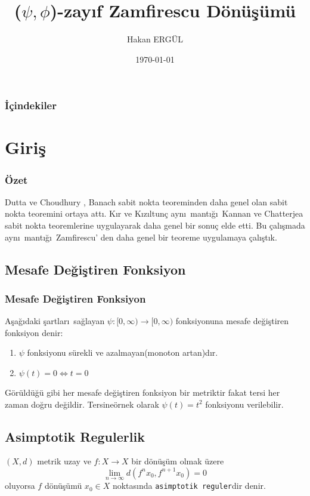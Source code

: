 \documentclass[8pt]{beamer}
\title{($\psi,\phi$)-zay\i f Zamfirescu D\"on\"u\c{s}\"um\"u}
\author{Hakan ERG\"UL}
\institute{Atat\"{u}rk \"{U}niversitesi}
\date{\today}
\begin{document}
\begin{frame}
\titlepage
\end{frame}
\begin{frame}
  \frametitle{\.{I}\c{c}indekiler}
  \tableofcontents
\end{frame}


\section{Giri\c{s}}
\begin{frame}
  \frametitle{\"Ozet}
  \textrm{Dutta ve Choudhury \cite{Dutta2008}, Banach sabit nokta teoreminden daha genel olan sabit nokta teoremini ortaya att\i . K\i r ve K\i z\i ltun\c{c} \cite{Kir2013} ayn\i \ mant\i \u{g}\i \ Kannan\cite{Kannan1969} ve Chatterjea\cite{Chatterjea1972} sabit nokta teoremlerine uygulayarak daha genel bir sonu\c{c} elde etti. Bu \c{c}al\i \c{s}mada ayn\i \ mant\i \u{g}\i \ Zamfirescu\cite{Zamfirescu1972}' den daha genel bir teoreme uygulamaya \c{c}al\i \c{s}t\i k.}
\end{frame}


\subsection{Mesafe De\u{g}i\c{s}tiren Fonksiyon}
\begin{frame}
\frametitle{Mesafe De\u{g}i\c{s}tiren Fonksiyon}
  \begin{definition}
     A\c{s}a\u{g}\i daki \c{s}artlar\i \ sa\u{g}layan $\psi:[0,\infty)\to[0,\infty)$ fonksiyonuna mesafe de\u{g}i\c{s}tiren fonksiyon denir:
     \begin{enumerate}
      \item $\psi$ fonksiyonu s\"urekli ve azalmayan(monoton artan)d\i r.
      \item $\psi(t)=0\Leftrightarrow t=0$
     \end{enumerate}
G\"or\"uld\"u\u{g}\"u gibi her mesafe de\u{g}i\c{s}tiren fonksiyon bir metriktir fakat tersi her zaman do\u{g}ru de\u{g}ildir. Tersine\"ornek olarak $\psi(t)=t^2$ fonksiyonu verilebilir.
\cite{Browder1966}
  \end{definition}
\end{frame}

\subsection{Asimptotik Regulerlik}
\begin{frame}
  \begin{definition}
     $(X,d)$ metrik uzay ve $f: X \rightarrow X$ bir d\"{o}n\"{u}\c{s}\"{u}m olmak \"uzere
     \begin{equation*}
       \lim_{n\to \infty}d(f^nx_0,f^{n+1}x_{0})=0 
     \end{equation*}
oluyorsa $f$ d\"{o}n\"{u}\c{s}\"{u}m\"{u} $x_0\in X$ noktas\i nda \texttt{asimptotik reguler}dir denir.
\cite{Browder1966}
  \end{definition}
\end{frame}
\end{document}
